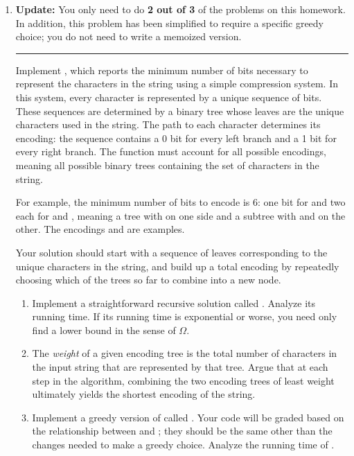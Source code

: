 \documentclass{article}
\begin{document}
\begin{enumerate}
\begin{enumerate}
    \end{enumerate}

  \newpage
  \item

    \noindent\textbf{Update:} You only need to do \textbf{2 out of 3} of the
    problems on this homework.  In addition, this problem has been simplified to
    require a specific greedy choice; you do not need to write a memoized
    version.

    \rule{\linewidth}{1pt}

    Implement , which reports the minimum number of bits
    necessary to represent the characters in the string  using a
    simple compression system.  In this system, every character is represented
    by a unique sequence of bits.  These sequences are determined by a binary
    tree whose leaves are the unique characters used in the string.  The path to
    each character determines its encoding: the sequence contains a 0 bit for
    every left branch and a 1 bit for every right branch.  The function
     must account for all possible encodings, meaning all
    possible binary trees containing the set of characters in the string.

    For example, the minimum number of bits to encode  is 6: one
    bit for  and two each for  and , meaning a
    tree with  on one side and a subtree with  and
     on the other.  The encodings  and
     are examples.

    Your solution should start with a sequence of leaves corresponding to the
    unique characters in the string, and build up a total encoding by repeatedly
    choosing which of the trees so far to combine into a new node.

    \begin{enumerate}

    \item Implement a straightforward recursive solution called
      .  Analyze its running time.  If its running
      time is exponential or worse, you need only find a lower bound in the
      sense of \(\Omega\).

    \item The \emph{weight} of a given encoding tree is the total number of
      characters in the input string that are represented by that tree.  Argue
      that at each step in the algorithm, combining the two encoding trees of
      least weight ultimately yields the shortest encoding of the string.

    \item Implement a greedy version of  called
      .  Your code will be graded based on the relationship
      between  and ; they should be
      the same other than the changes needed to make a greedy choice.  Analyze
      the running time of .

    \end{enumerate}

\end{enumerate}
\end{document}
